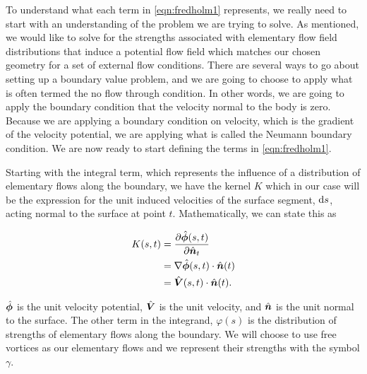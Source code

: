 To understand what each term in \cref{eqn:fredholm1} represents, we really need to start with an understanding of the problem we are trying to solve.
%
As mentioned, we would like to solve for the strengths associated with elementary flow field distributions that induce a potential flow field which matches our chosen geometry for a set of external flow conditions.
%
There are several ways to go about setting up a boundary value problem, and we are going to choose to apply what is often termed the no flow through condition.
%
In other words, we are going to apply the boundary condition that the velocity normal to the body is zero.
%
Because we are applying a boundary condition on velocity, which is the gradient of the velocity potential, we are applying what is called the Neumann boundary condition.
%
We are now ready to start defining the terms in \cref{eqn:fredholm1}.

Starting with the integral term, which represents the influence of a distribution of elementary flows along the boundary, we have the kernel \(K\) which in our case will be the expression for the unit induced velocities of the surface segment, \(\mathrm{d} s\), acting normal to the surface at point \(t\).
%
Mathematically, we can state this as

\begin{equation}
    \begin{aligned}
        K(s,t) &= \frac{\partial \hat{\bm{\phi}}(s,t)}{\partial \hat{\bm{n}}_t} \\
               &= \nabla \hat{\bm{\phi}}(s,t) \cdot \hat{\bm{n}}(t) \\
               &= \hat{\bm{V}}(s,t) \cdot \hat{\bm{n}}(t).
    \end{aligned}
\end{equation}

\where \(\hat{\bm{\phi}}\) is the unit velocity potential, \(\hat{\bm{V}}\) is the unit velocity, and \(\hat{\bm{n}}\) is the unit normal to the surface.
%
The other term in the integrand, \(\varphi(s)\) is the distribution of strengths of elementary flows along the boundary.
%
We will choose to use free vortices as our elementary flows and we represent their strengths with the symbol \(\gamma\).
%

